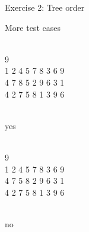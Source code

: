 \documentclass[handout]{beamer}
\begin{document}
\begin{frame}{Exercise 2: Tree order}

  \begin{exampleblock}{More test cases}
    \begin{minipage}[t]{0.3\linewidth}
    \\9\\1 2 4 5 7 8 3 6 9\\4 7 8 5 2 9 6 3 1\\4 2 7 5 8 1 3 9 6
    
    \medskip
    \\yes
    \end{minipage}
    \begin{minipage}[t]{0.3\linewidth}
    \\9\\1 2 4 5 7 8 3 6 9\\4 7 5 8 2 9 6 3 1\\4 2 7 5 8 1 3 9 6
    
    \medskip
    \\no
    \end{minipage}
  \end{exampleblock}
\end{frame}
\end{document}
